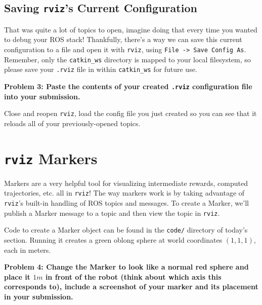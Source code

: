 \documentclass{article}
\begin{document}
\subsection{Saving \texttt{rviz}'s Current Configuration}

That was quite a lot of topics to open, imagine doing that every time you wanted to debug your ROS stack! Thankfully, there's a way we can save this current configuration to a file and open it with \texttt{rviz}, using \texttt{File -> Save Config As}. Remember, only the \texttt{catkin\_ws} directory is mapped to your local filesystem, so please save your \texttt{.rviz} file in within \texttt{catkin\_ws} for future use.

{\bf Problem 3: Paste the contents of your created \texttt{.rviz} configuration file into your submission.}

Close and reopen \texttt{rviz}, load the config file you just created so you can see that it reloads all of your previously-opened topics.

\section{\texttt{rviz} Markers}

Markers are a very helpful tool for visualizing intermediate rewards, computed trajectories, etc. all in \texttt{rviz}! The way markers work is by taking advantage of \texttt{rviz}'s built-in handling of ROS topics and messages. To create a Marker, we'll publish a Marker message to a topic and then view the topic in \texttt{rviz}.

Code to create a Marker object can be found in the \texttt{code/} directory of today's section. Running it creates a green oblong sphere at world coordinates $(1, 1, 1)$, each in meters.

{\bf Problem 4: Change the Marker to look like a normal red sphere and place it $1m$ in front of the robot (think about which axis this corresponds to), include a screenshot of your marker and its placement in your submission.}
\end{document}
